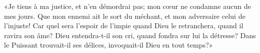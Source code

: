 «Je tiens à ma justice, et n’en démordrai pas;
	mon cœur ne condamne aucun de mes jours.
Que mon ennemi ait le sort du méchant, et mon adversaire celui de l’injuste!
Car quel sera l’espoir de l’impie quand Dieu le retranchera,
	quand il ravira son âme?
Dieu entendra-t-il son cri, quand fondra sur lui la détresse?
Dans le Puissant trouvait-il ses délices,
	invoquait-il Dieu en tout temps?»
